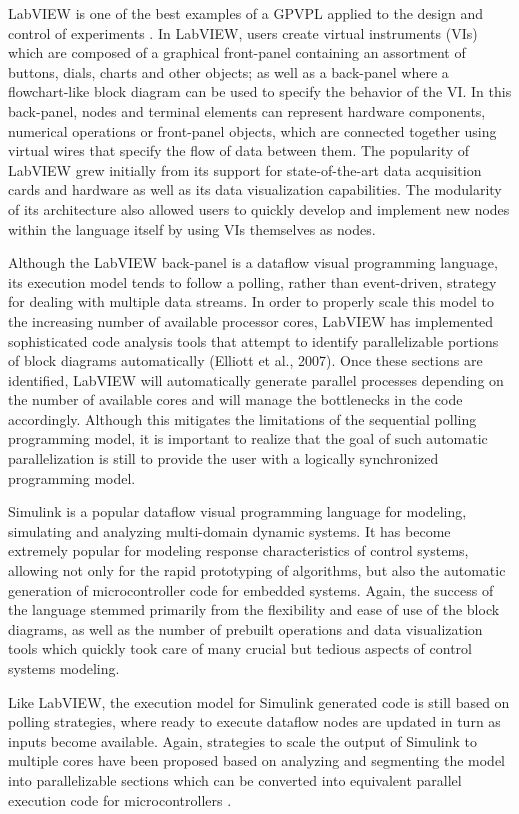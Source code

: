 LabVIEW is one of the best examples of a GPVPL applied to the design and control of experiments \cite{Elliott2007}. In LabVIEW, users create virtual instruments (VIs) which are composed of a graphical front-panel containing an assortment of buttons, dials, charts and other objects; as well as a back-panel where a flowchart-like block diagram can be used to specify the behavior of the VI. In this back-panel, nodes and terminal elements can represent hardware components, numerical operations or front-panel objects, which are connected together using virtual wires that specify the flow of data between them. The popularity of LabVIEW grew initially from its support for state-of-the-art data acquisition cards and hardware as well as its data visualization capabilities. The modularity of its architecture also allowed users to quickly develop and implement new nodes within the language itself by using VIs themselves as nodes.

Although the LabVIEW back-panel is a dataflow visual programming language, its execution model tends to follow a polling, rather than event-driven, strategy for dealing with multiple data streams. In order to properly scale this model to the increasing number of available processor cores, LabVIEW has implemented sophisticated code analysis tools that attempt to identify parallelizable portions of block diagrams automatically (Elliott et al., 2007). Once these sections are identified, LabVIEW will automatically generate parallel processes depending on the number of available cores and will manage the bottlenecks in the code accordingly. Although this mitigates the limitations of the sequential polling programming model, it is important to realize that the goal of such automatic parallelization is still to provide the user with a logically synchronized programming model.

Simulink is a popular dataflow visual programming language for modeling, simulating and analyzing multi-domain dynamic systems. It has become extremely popular for modeling response characteristics of control systems, allowing not only for the rapid prototyping of algorithms, but also the automatic generation of microcontroller code for embedded systems. Again, the success of the language stemmed primarily from the flexibility and ease of use of the block diagrams, as well as the number of prebuilt operations and data visualization tools which quickly took care of many crucial but tedious aspects of control systems modeling.

Like LabVIEW, the execution model for Simulink generated code is still based on polling strategies, where ready to execute dataflow nodes are updated in turn as inputs become available. Again, strategies to scale the output of Simulink to multiple cores have been proposed based on analyzing and segmenting the model into parallelizable sections which can be converted into equivalent parallel execution code for microcontrollers \cite{Kumura2012}.

